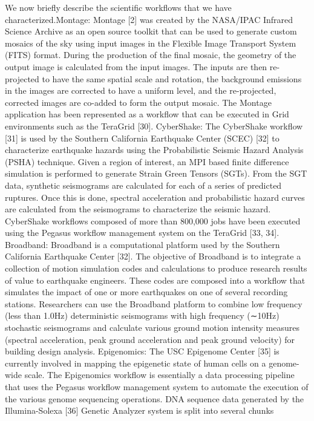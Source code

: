 \documentclass[final,5p,times,twocolumn]{elsarticle}
\begin{document}
We now briefly describe the scientific workflows that we have characterized.Montage: Montage [2] was created by the NASA/IPAC Infrared Science Archive as an open source toolkit that 
can be used to generate custom mosaics of the sky using input images in the Flexible Image Transport System 
(FITS) format. During the production of the final mosaic, the geometry of the output image is calculated from the 
input images. The inputs are then re-projected to have the same spatial scale and rotation, the background 
emissions in the images are corrected to have a uniform level, and the re-projected, corrected images are co-added 
to form the output mosaic. The Montage application has been represented as a workflow that can be executed in 
Grid environments such as the TeraGrid [30].
CyberShake: The CyberShake workflow [31] is used by the Southern California Earthquake Center (SCEC)
[32] to characterize earthquake hazards using the Probabilistic Seismic Hazard Analysis (PSHA) technique. Given 
a region of interest, an MPI based finite difference simulation is performed to generate Strain Green Tensors 
(SGTs). From the SGT data, synthetic seismograms are calculated for each of a series of predicted ruptures. Once 
this is done, spectral acceleration and probabilistic hazard curves are calculated from the seismograms to 
characterize the seismic hazard. CyberShake workflows composed of more than 800,000 jobs have been executed 
using the Pegasus workflow management system on the TeraGrid [33, 34].
Broadband: Broadband is a computational platform used by the Southern California Earthquake Center [32]. 
The objective of Broadband is to integrate a collection of motion simulation codes and calculations to produce 
research results of value to earthquake engineers. These codes are composed into a workflow that simulates the 
impact of one or more earthquakes on one of several recording stations. Researchers can use the Broadband 
platform to combine low frequency (less than 1.0Hz) deterministic seismograms with high frequency (∼10Hz) 
stochastic seismograms and calculate various ground motion intensity measures (spectral acceleration, peak ground 
acceleration and peak ground velocity) for building design analysis.
Epigenomics: The USC Epigenome Center [35] is currently involved in mapping the epigenetic state of human 
cells on a genome-wide scale. The Epigenomics workflow is essentially a data processing pipeline that uses the 
Pegasus workflow management system to automate the execution of the various genome sequencing operations. 
DNA sequence data generated by the Illumina-Solexa [36] Genetic Analyzer system is split into several chunks 
\end{document}
